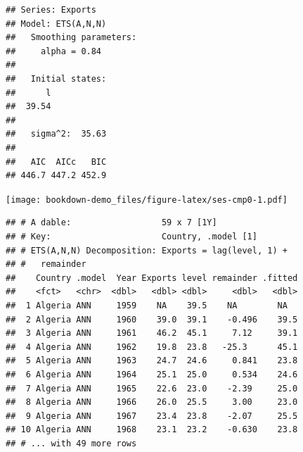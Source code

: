 \documentclass[]{book}
\newenvironment{Shaded}{\begin{snugshade}}{\end{snugshade}}
\newcommand{\DataTypeTok}[1]{\textcolor[rgb]{0.13,0.29,0.53}{#1}}
\newcommand{\DecValTok}[1]{\textcolor[rgb]{0.00,0.00,0.81}{#1}}
\newcommand{\KeywordTok}[1]{\textcolor[rgb]{0.13,0.29,0.53}{\textbf{#1}}}
\newcommand{\NormalTok}[1]{#1}
\newcommand{\OperatorTok}[1]{\textcolor[rgb]{0.81,0.36,0.00}{\textbf{#1}}}
\newcommand{\StringTok}[1]{\textcolor[rgb]{0.31,0.60,0.02}{#1}}
\begin{document}
\begin{verbatim}
## Series: Exports 
## Model: ETS(A,N,N) 
##   Smoothing parameters:
##     alpha = 0.84 
## 
##   Initial states:
##      l
##  39.54
## 
##   sigma^2:  35.63
## 
##   AIC  AICc   BIC 
## 446.7 447.2 452.9
\end{verbatim}

\begin{Shaded}
\end{Shaded}

\texttt{[image: bookdown-demo\_files/figure-latex/ses-cmp0-1.pdf]}

\begin{Shaded}
\end{Shaded}

\begin{verbatim}
## # A dable:                  59 x 7 [1Y]
## # Key:                      Country, .model [1]
## # ETS(A,N,N) Decomposition: Exports = lag(level, 1) +
## #   remainder
##    Country .model  Year Exports level remainder .fitted
##    <fct>   <chr>  <dbl>   <dbl> <dbl>     <dbl>   <dbl>
##  1 Algeria ANN     1959    NA    39.5    NA        NA  
##  2 Algeria ANN     1960    39.0  39.1    -0.496    39.5
##  3 Algeria ANN     1961    46.2  45.1     7.12     39.1
##  4 Algeria ANN     1962    19.8  23.8   -25.3      45.1
##  5 Algeria ANN     1963    24.7  24.6     0.841    23.8
##  6 Algeria ANN     1964    25.1  25.0     0.534    24.6
##  7 Algeria ANN     1965    22.6  23.0    -2.39     25.0
##  8 Algeria ANN     1966    26.0  25.5     3.00     23.0
##  9 Algeria ANN     1967    23.4  23.8    -2.07     25.5
## 10 Algeria ANN     1968    23.1  23.2    -0.630    23.8
## # ... with 49 more rows
\end{verbatim}

\begin{Shaded}
\end{Shaded}
\end{document}
